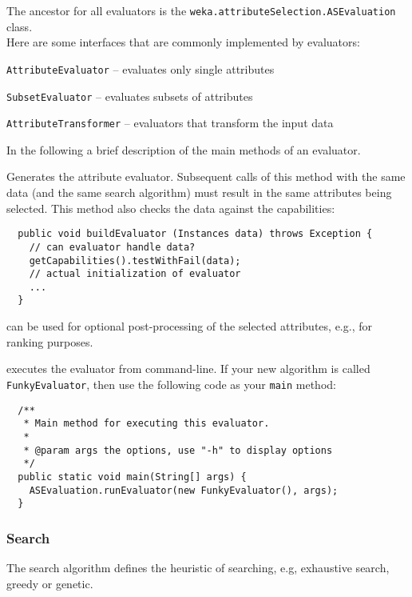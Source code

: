 The ancestor for all evaluators is the
\texttt{weka.attributeSelection.ASEvaluation} class. \\

\noindent Here are some interfaces that are commonly implemented by evaluators:
\begin{tight_itemize}
  \item \texttt{AttributeEvaluator} -- evaluates only single attributes
  \item \texttt{SubsetEvaluator} -- evaluates subsets of attributes
  \item \texttt{AttributeTransformer} -- evaluators that transform the input
data
\end{tight_itemize}

In the following a brief description of the main methods of an evaluator.

Generates the attribute evaluator. Subsequent calls of this method with the
same data (and the same search algorithm) must result in the same attributes
being selected. This method also checks the data against the capabilities:
\begin{verbatim}
  public void buildEvaluator (Instances data) throws Exception {
    // can evaluator handle data?
    getCapabilities().testWithFail(data);
    // actual initialization of evaluator
    ...
  }
\end{verbatim}

can be used for optional post-processing of the selected attributes, e.g., for
ranking purposes.

\newpage
{}
executes the evaluator from command-line. If your new algorithm is called
\texttt{FunkyEvaluator}, then use the following code as your \texttt{main}
method:
\begin{verbatim}
  /**
   * Main method for executing this evaluator.
   *
   * @param args the options, use "-h" to display options
   */
  public static void main(String[] args) {
    ASEvaluation.runEvaluator(new FunkyEvaluator(), args);
  }
\end{verbatim}

\subsubsection*{Search}
The search algorithm defines the heuristic of searching, e.g, exhaustive
search, greedy or genetic.

